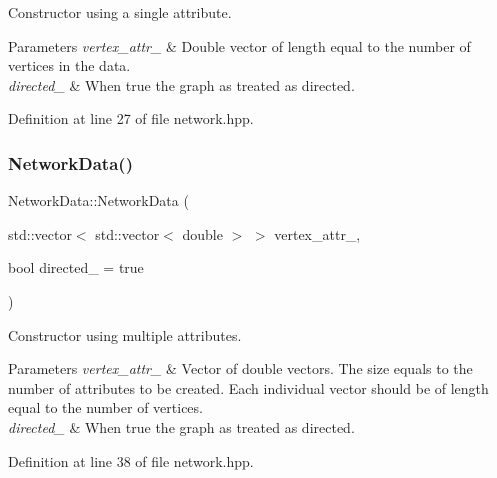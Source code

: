 Constructor using a single attribute. 


\begin{DoxyParams}{Parameters}
{\em vertex\+\_\+attr\+\_\+} & Double vector of length equal to the number of vertices in the data. \\
\hline
{\em directed\+\_\+} & When {\ttfamily true} the graph as treated as directed. \\
\hline
\end{DoxyParams}


Definition at line 27 of file network.\+hpp.

\mbox{\label{class_network_data_ac4b5a740d40bc84695653c3e3499ac65}} 
\subsubsection{\texorpdfstring{Network\+Data()}{NetworkData()}\hspace{0.1cm}{\footnotesize\ttfamily [3/3]}}
{\footnotesize\ttfamily Network\+Data\+::\+Network\+Data (\begin{DoxyParamCaption}\item[{std\+::vector$<$ std\+::vector$<$ double $>$ $>$}]{vertex\+\_\+attr\+\_\+,  }\item[{bool}]{directed\+\_\+ = {\ttfamily true} }\end{DoxyParamCaption})\hspace{0.3cm}{\ttfamily [inline]}}



Constructor using multiple attributes. 


\begin{DoxyParams}{Parameters}
{\em vertex\+\_\+attr\+\_\+} & Vector of double vectors. The size equals to the number of attributes to be created. Each individual vector should be of length equal to the number of vertices. \\
\hline
{\em directed\+\_\+} & When {\ttfamily true} the graph as treated as directed. \\
\hline
\end{DoxyParams}


Definition at line 38 of file network.\+hpp.

\mbox{\label{class_network_data_a4667137d76017d3c69a789ad6cf86931}} 
